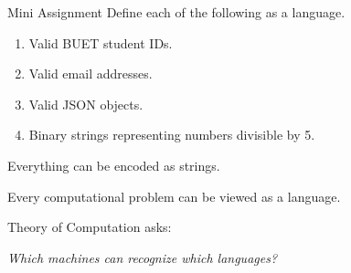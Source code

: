\documentclass[10pt,aspectratio=169]{beamer}
\begin{document}
\begin{frame}{Mini Assignment}
Define each of the following as a language.

\begin{enumerate}
    \item Valid BUET student IDs.
    \item Valid email addresses.
    \item Valid JSON objects.
    \item Binary strings representing numbers divisible by 5.
\end{enumerate}

\end{frame}

\begin{frame}[standout]
Everything can be encoded as strings.

\vspace{1em}

Every computational problem can be viewed as a language.

\vspace{1em}

Theory of Computation asks:

\vspace{0.5em}

\textit{Which machines can recognize which languages?}
\end{frame}

\end{document}
